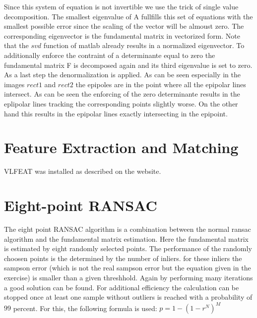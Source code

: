 \documentclass[12pt]{article}
\begin{document}
Since this system of equation is not invertible we use the trick of single value decomposition. The smallest eigenvalue of A fullfills this set of equations with the smallest possible error since the scaling of the vector will be almoust zero. The corresponding eigenvector is the fundamental matrix in vectorized form. Note that the $svd$ function of matlab already results in a normalized eigenvector. 
\newline
To additionally enforce the contraint of a determinante equal to zero the fundamental matrix F is decomposed again and its third eigenvalue is set to zero. As a last step the denormalization is applied. 
\vspace{5mm}
\newline
As can be seen especially in the images $rect1$ and $rect2$ the epipoles are in the point where all the epipolar lines intersect. As can be seen the enforcing of the zero determinante results in the eplipolar lines tracking the corresponding points slightly worse. On the other hand this results in the epipolar lines exactly intersecting in the epipoint. 



\section{Feature Extraction and Matching}
VLFEAT was installed as described on the website.
\vspace{5mm}

\section{Eight-point RANSAC}

The eight point RANSAC algorithm is a combination between the normal ransac algorithm and the fundamental matrix estimation. Here the fundamental matrix is estimated by eight randomly selected points. The performance of the randomly choosen points is the determined by the number of inliers. for these inliers the sampson error (which is not the real sampson error but the equation given in the exercise) is smaller than a given threshhold. Again by performing many iterations a good solution can be found. 
\vspace{5mm}
\newline
For additional efficiency the calculation can be stopped once at least one sample without outliers is reached with a probability of $99$ percent. 
\newline
For this, the following formula is used:
\vspace{5mm}
\newline
$p = 1- (1-r^N)^M$
 \vspace{5mm}
 \newline
\end{document}
